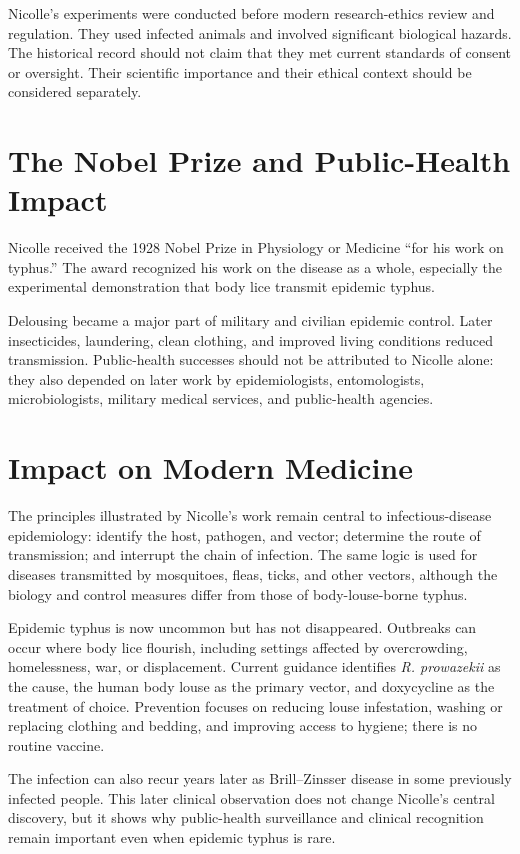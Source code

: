 Nicolle's experiments were conducted before modern research-ethics review and regulation. They used infected animals and involved significant biological hazards. The historical record should not claim that they met current standards of consent or oversight. Their scientific importance and their ethical context should be considered separately.

\section{The Nobel Prize and Public-Health Impact}

Nicolle received the 1928 Nobel Prize in Physiology or Medicine ``for his work on typhus.'' The award recognized his work on the disease as a whole, especially the experimental demonstration that body lice transmit epidemic typhus\cite{nobel-1928}.

Delousing became a major part of military and civilian epidemic control. Later insecticides, laundering, clean clothing, and improved living conditions reduced transmission. Public-health successes should not be attributed to Nicolle alone: they also depended on later work by epidemiologists, entomologists, microbiologists, military medical services, and public-health agencies.

\section{Impact on Modern Medicine}

The principles illustrated by Nicolle's work remain central to infectious-disease epidemiology: identify the host, pathogen, and vector; determine the route of transmission; and interrupt the chain of infection. The same logic is used for diseases transmitted by mosquitoes, fleas, ticks, and other vectors, although the biology and control measures differ from those of body-louse-borne typhus.

Epidemic typhus is now uncommon but has not disappeared. Outbreaks can occur where body lice flourish, including settings affected by overcrowding, homelessness, war, or displacement. Current guidance identifies \emph{R. prowazekii} as the cause, the human body louse as the primary vector, and doxycycline as the treatment of choice. Prevention focuses on reducing louse infestation, washing or replacing clothing and bedding, and improving access to hygiene; there is no routine vaccine.\cite{cdc-typhus}

The infection can also recur years later as Brill--Zinsser disease in some previously infected people. This later clinical observation does not change Nicolle's central discovery, but it shows why public-health surveillance and clinical recognition remain important even when epidemic typhus is rare.

